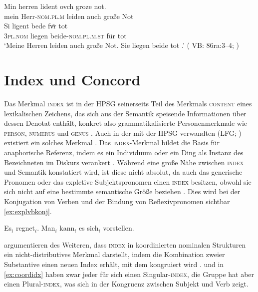 \begin{exe}
	\ex \label{ex:beidedomains_4}
		\gll Min herren lident ovch groze not. \\
			mein Herr-\textsc{nom.pl.m} leiden auch große Not \\
	\sn \gll Si ligent bede fvͤr tot \\
			\textsc{3pl\subM.nom} liegen beide-\textsc{nom.pl.m.st} für tot \\
	\trans `Meine Herren leiden auch große Not. Sie liegen beide tot
		.'
		(%
			VB: 86ra:3--4;
			\cite[vgl.][301 {[=~V.~12033--12034]}]{schroeder1895}%
		)		
\end{exe}

\section{Index und Concord}
\label{sec:indexconcord}

\label{phsec:index}
Das Merkmal \textsc{index} ist in der HPSG seinerseits Teil des Merkmals
\textsc{content} eines lexikalischen Zeichens, das sich aus der Semantik
speisende Informationen über dessen Denotat enthält, konkret also
grammatikalisierte Personenmerkmale wie \textsc{person}, \textsc{numerus} und
\textsc{genus} \citep[15--17]{wechslerzlatic2003}. Auch in der mit der HPSG
verwandten  (LFG;
\cites{kaplanbresnan1982}{bresnan2001}{bresnanetal2016}) existiert ein solches
Merkmal \citep[189--190]{bresnanetal2016}. Das \textsc{index}-Merkmal bildet
die Basis für anaphorische Referenz, indem es ein Individuum oder ein Ding als
Instanz des Bezeichneten im Diskurs verankert
\citep[10--11]{wechslerzlatic2003}. Während eine große Nähe zwischen
\textsc{index} und Semantik konstatiert wird, ist diese nicht absolut, da auch
das generische Pronomen  oder das expletive Subjektspronomen 
einen \textsc{index} besitzen, obwohl sie sich nicht auf eine bestimmte
semantische Größe beziehen \citep[11--13]{wechslerzlatic2003}. Dies wird bei
der Konjugation von Verben und der Bindung von Reflexivpronomen sichtbar
\cref{ex:explvbkonj}.

\begin{exe}
\ex \label{ex:explvbkonj}
	\begin{xlist}
	\ex Es$_i$ regnet$_i$.
	\ex Man$_i$ kann$_i$ es sich$_i$ vorstellen.
	\end{xlist}
\end{exe}

\citet{kingdalrymple2004} argumentieren des Weiteren, dass \textsc{index} in
koordinierten nominalen Strukturen ein nicht-distributives Merkmal darstellt,
indem die Kombination zweier Substantive einen neuen Index erhält, mit dem
kongruiert wird \citep[74--76]{kingdalrymple2004}.  und  in
\cref{ex:coordidx} haben zwar jeder für sich einen Singular-\textsc{index}, die
Gruppe  hat aber einen Plural-\textsc{index}, was sich in
der Kongruenz zwischen Subjekt und Verb zeigt.

